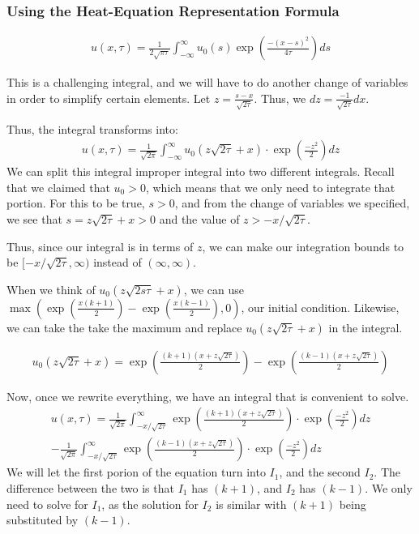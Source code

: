 \documentclass{article}
\begin{document}
\subsubsection*{Using the Heat-Equation Representation Formula}

\begin{align}
    u(x, \tau) = \frac{1}{2\sqrt{\pi \tau}} \int_{-\infty}^{\infty} u_0(s) \exp(\frac{-(x-s)^2}{4\tau}) ds
\end{align}

This is a challenging integral, and we will have to do another change of variables in order to simplify certain elements.
Let $z = \frac{s-x}{\sqrt{2\tau}}$. Thus, we $dz = \frac{-1}{\sqrt{2\tau}} dx$. 

Thus, the integral transforms into:
\begin{align*}
    u(x,\tau) = \frac{1}{\sqrt{2\pi}} \int_{-\infty}^{\infty} u_{0}(z\sqrt{2\tau} + x)\cdot \exp(\frac{-z^2}{2}) dz
\end{align*}
We can split this integral improper integral into two different integrals. Recall that we claimed that $u_0 > 0$, which means that we only need to integrate that portion. 
For this to be true, $s > 0$, and from the change of variables we specified, we see that $s = z\sqrt{2\tau} + x > 0$ and the value of $z > -x/\sqrt{2\tau}$. 

Thus, since our integral is in terms of $z$, we can make our integration bounds to be $[-x/\sqrt{2\tau}, \infty)$ instead of $(\infty, \infty)$.

When we think of $u_{0}(z\sqrt{2s\tau} + x)$, we can use $\max(\exp(\frac{x(k+1)}{2}) - \exp(\frac{x(k-1)}{2}), 0)$, our initial condition.
Likewise, we can take the take the maximum and replace $u_{0}(z\sqrt{2\tau} + x)$ in the integral.

\begin{align*}
    u_0(z\sqrt{2\tau} + x) = \exp(\frac{(k+1)(x+z\sqrt{2\tau})}{2}) - \exp(\frac{(k-1)(x+z\sqrt{2\tau})}{2})
\end{align*}

Now, once we rewrite everything, we have an integral that is convenient to solve.
\begin{align*}
    u(x,\tau) = \frac{1}{\sqrt{2\pi}} \int_{-x/\sqrt{2\tau}}^{\infty} \exp(\frac{(k+1)(x+z\sqrt{2\tau})}{2}) \cdot \exp(\frac{-z^2}{2}) dz\\
    -\frac{1}{\sqrt{2\pi}} \int_{-x/\sqrt{2\tau}}^{\infty} \exp(\frac{(k-1)(x+z\sqrt{2\tau})}{2}) \cdot \exp(\frac{-z^2}{2}) dz
\end{align*}
We will let the first porion of the equation turn into $I_1$, and the second $I_2$. The difference between the two is that $I_1$ has $(k+1)$,
and $I_2$ has $(k-1)$. We only need to solve for $I_1$, as the solution for $I_2$ is similar with $(k+1)$ being substituted by $(k-1)$.
\end{document}
